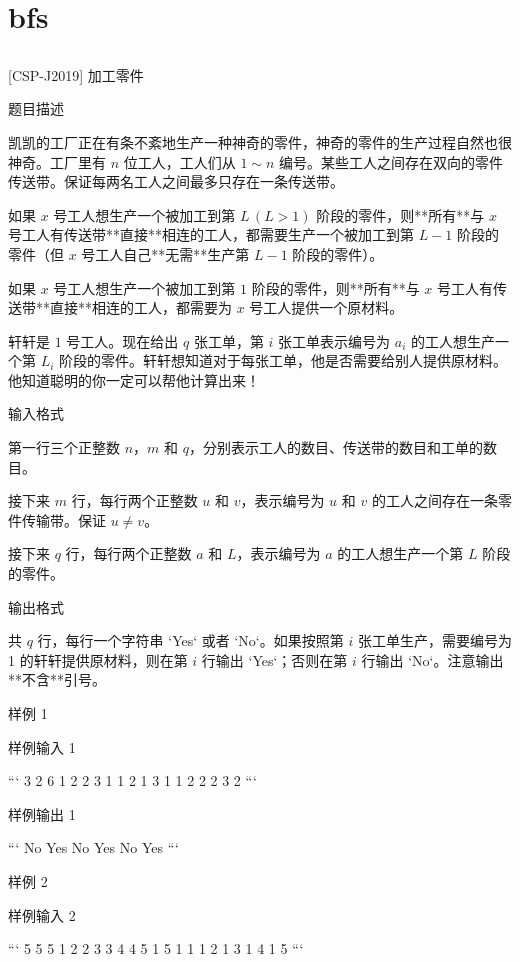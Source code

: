 \documentclass[12pt,twiside,a4paper]{ctexbook}
\numberwithin{chapter}{part}
\begin{document}
\chapter{bfs}
\section{}
 [CSP-J2019] 加工零件

 题目描述

凯凯的工厂正在有条不紊地生产一种神奇的零件，神奇的零件的生产过程自然也很神奇。工厂里有 $n$ 位工人，工人们从 $1 \sim n$ 编号。某些工人之间存在双向的零件传送带。保证每两名工人之间最多只存在一条传送带。

如果 $x$ 号工人想生产一个被加工到第 $L\,(L>1)$ 阶段的零件，则**所有**与 $x$ 号工人有传送带**直接**相连的工人，都需要生产一个被加工到第 $L - 1$ 阶段的零件（但 $x$ 号工人自己**无需**生产第 $L - 1$ 阶段的零件）。

如果 $x$ 号工人想生产一个被加工到第 $1$ 阶段的零件，则**所有**与 $x$ 号工人有传送带**直接**相连的工人，都需要为 $x$ 号工人提供一个原材料。

轩轩是 $1$ 号工人。现在给出 $q$ 张工单，第 $i$ 张工单表示编号为 $a_i$ 的工人想生产一个第 $L_i$ 阶段的零件。轩轩想知道对于每张工单，他是否需要给别人提供原材料。他知道聪明的你一定可以帮他计算出来！

 输入格式

第一行三个正整数 $n$，$m$ 和 $q$，分别表示工人的数目、传送带的数目和工单的数目。

接下来 $m$ 行，每行两个正整数 $u$ 和 $v$，表示编号为 $u$ 和 $v$ 的工人之间存在一条零件传输带。保证 $u \neq v$。

接下来 $q$ 行，每行两个正整数 $a$ 和 $L$，表示编号为 $a$ 的工人想生产一个第 $L$ 阶段的零件。

 输出格式

共 $q$ 行，每行一个字符串 `Yes` 或者 `No`。如果按照第 $i$ 张工单生产，需要编号为 1 的轩轩提供原材料，则在第 $i$ 行输出 `Yes`；否则在第 $i$ 行输出 `No`。注意输出**不含**引号。

 样例 1

 样例输入 1

```
3 2 6
1 2
2 3
1 1
2 1
3 1
1 2
2 2
3 2
```

 样例输出 1

```
No
Yes
No
Yes
No
Yes
```

 样例 2

 样例输入 2

```
5 5 5
1 2
2 3
3 4
4 5
1 5
1 1
1 2
1 3
1 4
1 5
```
\end{document}
